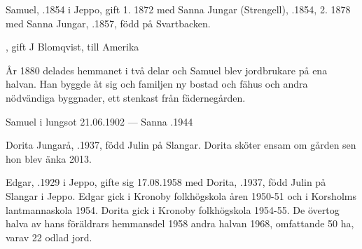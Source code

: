 Samuel, .1854 i Jeppo, gift 1. 1872 med Sanna Jungar (Strengell), .1854, 2. 1878 med Sanna Jungar, .1857, född på Svartbacken.
\begin{jhchildren}
  \item {}
  \item {}
  \item {}
  \item {}
  \item {}
  \item {}
  \item {}
  \item {}
  \item {}, gift J Blomqvist, till Amerika
  \item {}
  \item {}
\end{jhchildren}
År 1880 delades hemmanet i två delar och Samuel blev jordbrukare på ena halvan. Han byggde åt sig och familjen ny bostad och fähus och andra nödvändiga byggnader, ett stenkast från fädernegården.

Samuel \textdied i lungsot 21.06.1902  ---  Sanna .1944





Dorita Jungarå, .1937, född Julin på Slangar. Dorita sköter ensam om gården sen hon blev änka 2013.\jhvspace{}



Edgar, .1929 i Jeppo, gifte sig 17.08.1958 med Dorita, .1937, född Julin på Slangar i Jeppo.
Edgar gick i Kronoby folkhögskola åren 1950-51 och i Korsholms lantmannaskola 1954. Dorita gick i Kronoby folkhögskola 1954-55. De övertog halva av hans föräldrars hemmansdel 1958 andra halvan 1968, omfattande 50 ha, varav 22 odlad jord.

